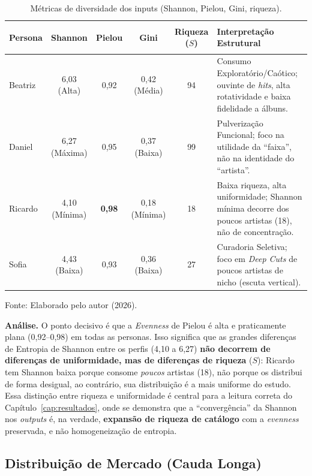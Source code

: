 \documentclass[12pt, %
openright,
oneside, %
a4paper,    %
english,   %
brazil]{facom-ufu-abntex2}
\newcommand{\fontefig}[1]{%
  \par\nopagebreak\vspace{0.15cm}%
  {\centering\footnotesize Fonte: #1\par}%
}
\begin{document}
\begin{table}[H]
\centering
\caption{Métricas de diversidade dos inputs (Shannon, Pielou, Gini, riqueza).}
\label{tab:diversidade}
\footnotesize
\begin{tabularx}{\textwidth}{>{\bfseries\raggedright\arraybackslash}p{1.7cm} c c c c X}
\toprule
\textbf{Persona} & \textbf{Shannon} & \textbf{Pielou} & \textbf{Gini} & \textbf{Riqueza ($S$)} & \textbf{Interpretação Estrutural} \\
\midrule
Beatriz & 6,03 (Alta) & 0,92 & 0,42 (Média) & 94 & Consumo Exploratório/Caótico; ouvinte de \emph{hits}, alta rotatividade e baixa fidelidade a álbuns. \\
Daniel & 6,27 (Máxima) & 0,95 & 0,37 (Baixa) & 99 & Pulverização Funcional; foco na utilidade da ``faixa'', não na identidade do ``artista''. \\
Ricardo & 4,10 (Mínima) & \textbf{0,98} & 0,18 (Mínima) & 18 & Baixa riqueza, alta uniformidade; Shannon mínima decorre dos poucos artistas (18), não de concentração. \\
Sofia & 4,43 (Baixa) & 0,93 & 0,36 (Baixa) & 27 & Curadoria Seletiva; foco em \emph{Deep Cuts} de poucos artistas de nicho (escuta vertical). \\
\bottomrule
\end{tabularx}
\fontefig{Elaborado pelo autor (2026).}
\end{table}

\textbf{Análise.} O ponto decisivo é que a \emph{Evenness} de Pielou é alta e
praticamente plana (0,92--0,98) em todas as personas. Isso significa que as
grandes diferenças de Entropia de Shannon entre os perfis (4,10 a 6,27)
\textbf{não decorrem de diferenças de uniformidade, mas de diferenças de riqueza}
($S$): Ricardo tem Shannon baixa porque consome \emph{poucos} artistas (18), não
porque os distribui de forma desigual, ao contrário, sua distribuição é a mais
uniforme do estudo. Essa distinção entre riqueza e uniformidade é central para a
leitura correta do Capítulo~\ref{cap:resultados}, onde se demonstra que a
``convergência'' da Shannon nos \emph{outputs} é, na verdade, \textbf{expansão de
riqueza de catálogo} com a \emph{evenness} preservada, e não homogeneização de
entropia.

\subsection{Distribuição de Mercado (Cauda Longa)}
\end{document}
